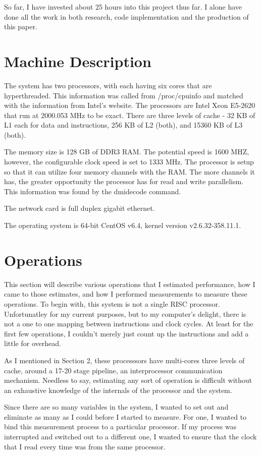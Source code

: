 \documentclass[paper=a4, fontsize=11pt]{scrartcl}
\numberwithin{equation}{section}		%
\numberwithin{figure}{section}			%
\numberwithin{table}{section}				%
\begin{document}
So far, I have invested about 25 hours into this project thus far.  I alone have done all the work in both research, code implementation and the production of this paper.

\section{Machine Description}

The system has two processors, with each having six cores that are hyperthreaded.  This information was called from /proc/cpuinfo and matched with the information from Intel's website.  The processors are Intel Xeon E5-2620 that run at 2000.053 MHz to be exact.  There are three levels of cache - 32 KB of L1 each for data and instructions, 256 KB of L2 (both), and 15360 KB of L3 (both).  

The memory size is 128 GB of DDR3 RAM.  The potential speed is 1600 MHZ, however, the configurable clock speed is set to 1333 MHz.  The processor is setup so that it can utilize four memory channels with the RAM.  The more channels it has, the greater opportunity the processor has for read and write parallelism.  This information was found by the dmidecode command.

The network card is full duplex gigabit ethernet.

The operating system is 64-bit CentOS v6.4, kernel version v2.6.32-358.11.1.

\section{Operations}
This section will describe various operations that I estimated performance, how I came to those estimates, and how I performed measurements to measure these operations.  To begin with, this system is not a single RISC processor.  Unfortunatley for my current purposes, but to my computer's delight, there is not a one to one mapping between instructions and clock cycles.  At least for the first few operations, I couldn't merely just count up the instructions and add a little for overhead.

As I mentioned in Section 2, these processsors have multi-cores three levels of cache, around a 17-20 stage pipeline, an interprocessor communication mechanism.  Needless to say, estimating any sort of operation is difficult without an exhaustive knowledge of the internals of the processor and the system.

Since there are so many variables in the system, I wanted to set out and eliminate as many as I could before I started to measure.  For one, I wanted to bind this measurement process to a particular processor.  If my process was interrupted and switched out to a different one, I wanted to ensure that the clock that I read every time was from the same processor.
\end{document}
